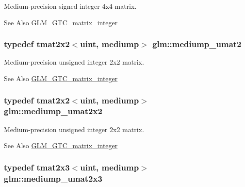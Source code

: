 Medium-\/precision signed integer 4x4 matrix. \begin{DoxySeeAlso}{See Also}
\hyperlink{group__gtc__matrix__integer}{G\-L\-M\-\_\-\-G\-T\-C\-\_\-matrix\-\_\-integer} 
\end{DoxySeeAlso}
\hypertarget{group__gtc__matrix__integer_ga85bc35173415dba31bb964c2940feeec}{
\subsubsection[{mediump\-\_\-umat2}]{\setlength{\rightskip}{0pt plus 5cm}typedef tmat2x2$<$uint, mediump$>$ {\bf glm\-::mediump\-\_\-umat2}}}\label{group__gtc__matrix__integer_ga85bc35173415dba31bb964c2940feeec}
Medium-\/precision unsigned integer 2x2 matrix. \begin{DoxySeeAlso}{See Also}
\hyperlink{group__gtc__matrix__integer}{G\-L\-M\-\_\-\-G\-T\-C\-\_\-matrix\-\_\-integer} 
\end{DoxySeeAlso}
\hypertarget{group__gtc__matrix__integer_gafce8777b8b0d9d7f810853b22de3be1b}{
\subsubsection[{mediump\-\_\-umat2x2}]{\setlength{\rightskip}{0pt plus 5cm}typedef tmat2x2$<$uint, mediump$>$ {\bf glm\-::mediump\-\_\-umat2x2}}}\label{group__gtc__matrix__integer_gafce8777b8b0d9d7f810853b22de3be1b}
Medium-\/precision unsigned integer 2x2 matrix. \begin{DoxySeeAlso}{See Also}
\hyperlink{group__gtc__matrix__integer}{G\-L\-M\-\_\-\-G\-T\-C\-\_\-matrix\-\_\-integer} 
\end{DoxySeeAlso}
\hypertarget{group__gtc__matrix__integer_ga23dfc19249ad27dc4b02615f1d045ba1}{
\subsubsection[{mediump\-\_\-umat2x3}]{\setlength{\rightskip}{0pt plus 5cm}typedef tmat2x3$<$uint, mediump$>$ {\bf glm\-::mediump\-\_\-umat2x3}}}\label{group__gtc__matrix__integer_ga23dfc19249ad27dc4b02615f1d045ba1}
